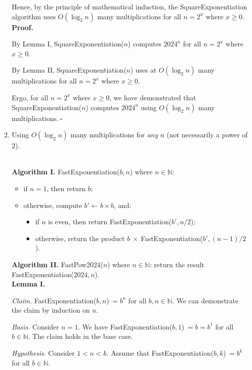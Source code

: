 \begin{enumerate}
\begin{solution}
Hence, by the principle of mathematical induction, the {\sc SquareExponentiation} algorithm uses $O(\log_2n)$ many multiplications for all $n=2^x$ where $x\geq 0$.\\

\textbf{Proof. }

By Lemma I, {\sc SquareExponentiation}($n$) computes $2024^n$ for all $n=2^x$ where $x\geq 0$.

By Lemma II, {\sc SquareExponentiation}($n$) uses at $O(\log_2n)$ many multiplications for all $n=2^x$ where $x\geq 0$.

Ergo, for all $n=2^x$ where $x\geq 0$, we have demonstrated that {\sc SquareExponentiation}($n$) computes $2024^n$ using $O(\log_2n)$ many multiplications.$~\square$
\end{solution}
\newpage
\item Using $O(\log_2 n)$ many multiplications for \emph{any} $n$ (not necessarily a power of $2$).
\begin{solution}\\

\textbf{Algorithm I. }{\sc FastExponentiation}($b,n$) where $n\in\mathbb{N}$:
\begin{itemize}
\item if $n=1$, then return $b$;
\item otherwise, compute $b'\leftarrow b\times b$, and:
\begin{itemize}
    \item if $n$ is even, then return {\sc FastExponentiation}($b',n/2$);
    \item otherwise, return the product $b~\times~${\sc FastExponentiation}($b',(n-1)/2$).
\end{itemize}
\end{itemize}

\textbf{Algorithm II. }{\sc FastPow2024($n$)} where $n\in\mathbb{N}$: return the result {\sc FastExponentiation}($2024,n$).\\

\textbf{Lemma I.}

\textit{Claim. }{\sc FastExponentiation}($b,n$)$~=b^n$ for all $b,n\in\mathbb{N}$. We can demonstrate the claim by induction on $n$.

\textit{Basis. }Consider $n=1$. We have {\sc FastExponentiation}($b,1$)$~=b=b^1$ for all $b\in\mathbb{N}$. The claim holds in the base case.

\textit{Hypothesis. }Consider $1<n<k$. Assume that {\sc FastExponentiation}($b,k$)$~=b^k$ for all $b\in\mathbb{N}$.


\end{solution}
\end{enumerate}
